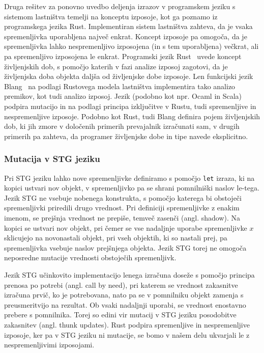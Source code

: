Druga rešitev za ponovno uvedbo deljenja izrazov v programskem jeziku s sistemom lastništva temelji na konceptu izposoje, kot ga poznamo iz programskega jezika Rust. Implementiran sistem lastništva zahteva, da je vsaka spremenljivka uporabljena največ enkrat. Koncept izposoje pa omogoča, da je spremenljivka lahko nespremenljivo izposojena (in s tem uporabljena) večkrat, ali pa spremenljivo izposojena le enkrat. Programski jezik Rust~\cite{klabnik2023rust} uvede koncept življenjskih dob, s pomočjo katerih v fazi analize izposoj zagotovi, da je življenjska doba objekta daljša od življenjske dobe izposoje. Len funkcijski jezik Blang~\cite{turk2022len} na podlagi Rustovega modela lastništva implementira tako analizo premikov, kot tudi analizo izposoj. Jezik (podobno kot npr. Ocaml in Scala) podpira mutacijo in na podlagi principa izključitve v Rustu, tudi spremenljive in nespremenljive izposoje. Podobno kot Rust, tudi Blang definira pojem življenjskih dob, ki jih zmore v določenih primerih prevajalnik izračunati sam, v drugih primerih pa zahteva, da programer življenjske dobe in tipe navede eksplicitno.

\subsubsection{Mutacija v STG jeziku}
Pri STG jeziku lahko nove spremenljivke definiramo s pomočjo \texttt{let} izraza, ki na kopici ustvari nov objekt, v spremenljivko pa se shrani pomnilniški naslov le-tega. Jezik STG ne vsebuje nobenega konstrukta, s pomočjo katerega bi obstoječi spremenljivki priredili drugo vrednost. Pri definiciji spremenljivke z enakim imenom, se prejšnja vrednost ne prepiše, temveč zasenči (angl. shadow). Na kopici se ustvari nov objekt, pri čemer se vse nadaljnje uporabe spremenljivke $x$ sklicujejo na novonastali objekt, pri vseh objektih, ki so nastali prej, pa spremenljivka vsebuje naslov prejšnjega objekta. Jezik STG torej ne omogoča neposredne mutacije vrednosti obstoječih spremenljivk.

Jezik STG učinkovito implementacijo lenega izračuna doseže s pomočjo principa prenosa po potrebi (angl. call by need), pri katerem se vrednost zakasnitve izračuna prvič, ko je potrebovana, nato pa se v pomnilniku objekt zamenja s preusmeritvijo na rezultat. Ob vsaki nadaljnji uporabi, se vrednost enostavno prebere s pomnilnika. Torej so edini vir mutacij v STG jeziku posodobitve zakasnitev (angl. thunk updates). Rust podpira spremenljive in nespremenljive izposoje, ker pa v STG jeziku ni mutacije, se bomo v našem delu ukvarjali le z nespremenljivimi izposojami.

